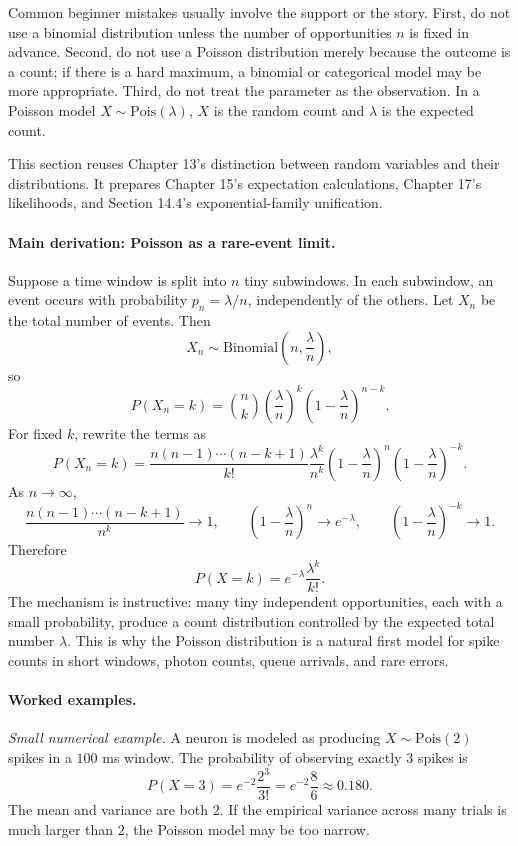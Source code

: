 Common beginner mistakes usually involve the support or the story. First, do not use a binomial distribution unless the number of opportunities \(n\) is fixed in advance. Second, do not use a Poisson distribution merely because the outcome is a count; if there is a hard maximum, a binomial or categorical model may be more appropriate. Third, do not treat the parameter as the observation. In a Poisson model \(X\sim\mathrm{Pois}(\lambda)\), \(X\) is the random count and \(\lambda\) is the expected count.

This section reuses Chapter 13's distinction between random variables and their distributions. It prepares Chapter 15's expectation calculations, Chapter 17's likelihoods, and Section 14.4's exponential-family unification.

\paragraph{Main derivation: Poisson as a rare-event limit.}
Suppose a time window is split into \(n\) tiny subwindows. In each subwindow, an event occurs with probability \(p_n=\lambda/n\), independently of the others. Let \(X_n\) be the total number of events. Then
\[
X_n\sim\mathrm{Binomial}\left(n,\frac{\lambda}{n}\right),
\]
so
\[
P(X_n=k)
=\binom nk\left(\frac{\lambda}{n}\right)^k
\left(1-\frac{\lambda}{n}\right)^{n-k}.
\]
For fixed \(k\), rewrite the terms as
\[
P(X_n=k)
=
\frac{n(n-1)\cdots(n-k+1)}{k!}
\frac{\lambda^k}{n^k}
\left(1-\frac{\lambda}{n}\right)^n
\left(1-\frac{\lambda}{n}\right)^{-k}.
\]
As \(n\to\infty\),
\[
\frac{n(n-1)\cdots(n-k+1)}{n^k}\to1,\qquad
\left(1-\frac{\lambda}{n}\right)^n\to e^{-\lambda},
\qquad
\left(1-\frac{\lambda}{n}\right)^{-k}\to1.
\]
Therefore
\[
\boxed{P(X=k)=e^{-\lambda}\frac{\lambda^k}{k!}.}
\]
The mechanism is instructive: many tiny independent opportunities, each with a small probability, produce a count distribution controlled by the expected total number \(\lambda\). This is why the Poisson distribution is a natural first model for spike counts in short windows, photon counts, queue arrivals, and rare errors.

\paragraph{Worked examples.}
\emph{Small numerical example.} A neuron is modeled as producing \(X\sim\mathrm{Pois}(2)\) spikes in a \(100\) ms window. The probability of observing exactly \(3\) spikes is
\[
P(X=3)=e^{-2}\frac{2^3}{3!}
=e^{-2}\frac{8}{6}
\approx0.180.
\]
The mean and variance are both \(2\). If the empirical variance across many trials is much larger than \(2\), the Poisson model may be too narrow.

